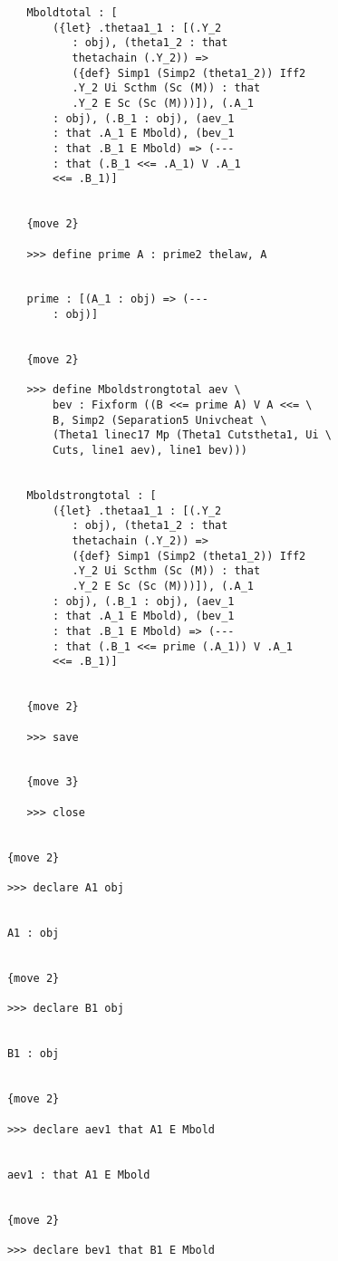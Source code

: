 \documentclass[12pt]{article}
\begin{document}
\begin{verbatim}
         Mboldtotal : [
             ({let} .thetaa1_1 : [(.Y_2 
                : obj), (theta1_2 : that 
                thetachain (.Y_2)) => 
                ({def} Simp1 (Simp2 (theta1_2)) Iff2 
                .Y_2 Ui Scthm (Sc (M)) : that 
                .Y_2 E Sc (Sc (M)))]), (.A_1 
             : obj), (.B_1 : obj), (aev_1 
             : that .A_1 E Mbold), (bev_1 
             : that .B_1 E Mbold) => (--- 
             : that (.B_1 <<= .A_1) V .A_1 
             <<= .B_1)]


         {move 2}

         >>> define prime A : prime2 thelaw, A


         prime : [(A_1 : obj) => (--- 
             : obj)]


         {move 2}

         >>> define Mboldstrongtotal aev \
             bev : Fixform ((B <<= prime A) V A <<= \
             B, Simp2 (Separation5 Univcheat \
             (Theta1 linec17 Mp (Theta1 Cutstheta1, Ui \
             Cuts, line1 aev), line1 bev)))


         Mboldstrongtotal : [
             ({let} .thetaa1_1 : [(.Y_2 
                : obj), (theta1_2 : that 
                thetachain (.Y_2)) => 
                ({def} Simp1 (Simp2 (theta1_2)) Iff2 
                .Y_2 Ui Scthm (Sc (M)) : that 
                .Y_2 E Sc (Sc (M)))]), (.A_1 
             : obj), (.B_1 : obj), (aev_1 
             : that .A_1 E Mbold), (bev_1 
             : that .B_1 E Mbold) => (--- 
             : that (.B_1 <<= prime (.A_1)) V .A_1 
             <<= .B_1)]


         {move 2}

         >>> save


         {move 3}

         >>> close


      {move 2}

      >>> declare A1 obj


      A1 : obj


      {move 2}

      >>> declare B1 obj


      B1 : obj


      {move 2}

      >>> declare aev1 that A1 E Mbold


      aev1 : that A1 E Mbold


      {move 2}

      >>> declare bev1 that B1 E Mbold



\end{verbatim}
\end{document}
